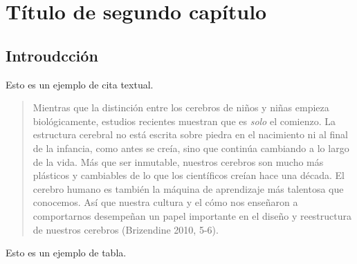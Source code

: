 \chapter{Título de segundo capítulo}

\section{Introudcción}

Esto es un ejemplo de cita textual.

\begin{quote}
    \small{Mientras que la distinción entre los cerebros de niños y niñas empieza biológicamente, estudios recientes muestran que es \textit{solo} el comienzo. La estructura cerebral no está escrita sobre piedra en el nacimiento ni al final de la infancia, como antes se creía, sino que continúa cambiando a lo largo de la vida. Más que ser inmutable, nuestros cerebros son mucho más plásticos y cambiables de lo que los científicos creían hace una década. El cerebro humano es también la máquina de aprendizaje más talentosa que conocemos. Así que nuestra cultura y el cómo nos enseñaron a comportarnos desempeñan un papel importante en el diseño y reestructura de nuestros cerebros (Brizendine 2010, 5-6).}
\end{quote}

Esto es un ejemplo de tabla. 


